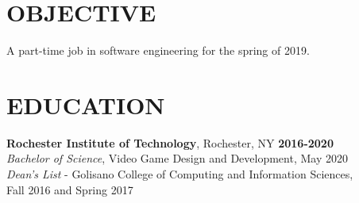 \documentclass[line,margin]{res}
\begin{document}

\noindent
\makebox[0pt][l]{}%
\makebox[\textwidth][c]{}%
\makebox[0pt][l]{}%
\makebox[\textwidth][c]{}%
\makebox[0pt][l]{}%
\makebox[\textwidth][c]{}%



\begin{resume}

\section{OBJECTIVE}
A part-time job in software engineering for the spring of 2019.



\section{EDUCATION}
\textbf{Rochester Institute of Technology}, Rochester, NY\hfill
    \textbf{2016-2020}\\
{\sl Bachelor of Science}, Video Game Design and Development, May 2020
\\
{\sl Dean's List} - Golisano College of Computing and Information Sciences,\hfill \\ Fall 2016 and Spring 2017

\end{resume}
\end{document}
